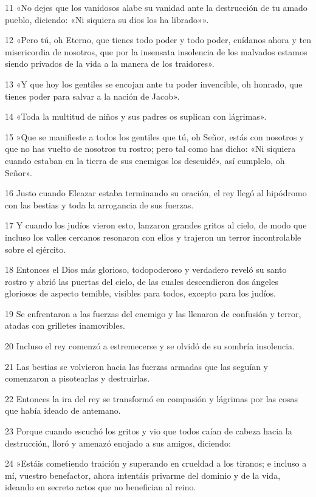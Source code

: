 \par 11 «No dejes que los vanidosos alabe su vanidad ante la destrucción de tu amado pueblo, diciendo: «Ni siquiera su dios los ha librado»».
\par 12 «Pero tú, oh Eterno, que tienes todo poder y todo poder, cuídanos ahora y ten misericordia de nosotros, que por la insensata insolencia de los malvados estamos siendo privados de la vida a la manera de los traidores».
\par 13 «Y que hoy los gentiles se encojan ante tu poder invencible, oh honrado, que tienes poder para salvar a la nación de Jacob».
\par 14 «Toda la multitud de niños y sus padres os suplican con lágrimas».
\par 15 »Que se manifieste a todos los gentiles que tú, oh Señor, estás con nosotros y que no has vuelto de nosotros tu rostro; pero tal como has dicho: «Ni siquiera cuando estaban en la tierra de sus enemigos los descuidé», así cumplelo, oh Señor».
\par 16 Justo cuando Eleazar estaba terminando su oración, el rey llegó al hipódromo con las bestias y toda la arrogancia de sus fuerzas.
\par 17 Y cuando los judíos vieron esto, lanzaron grandes gritos al cielo, de modo que incluso los valles cercanos resonaron con ellos y trajeron un terror incontrolable sobre el ejército.
\par 18 Entonces el Dios más glorioso, todopoderoso y verdadero reveló su santo rostro y abrió las puertas del cielo, de las cuales descendieron dos ángeles gloriosos de aspecto temible, visibles para todos, excepto para los judíos.
\par 19 Se enfrentaron a las fuerzas del enemigo y las llenaron de confusión y terror, atadas con grilletes inamovibles.
\par 20 Incluso el rey comenzó a estremecerse y se olvidó de su sombría insolencia.
\par 21 Las bestias se volvieron hacia las fuerzas armadas que las seguían y comenzaron a pisotearlas y destruirlas.
\par 22 Entonces la ira del rey se transformó en compasión y lágrimas por las cosas que había ideado de antemano.
\par 23 Porque cuando escuchó los gritos y vio que todos caían de cabeza hacia la destrucción, lloró y amenazó enojado a sus amigos, diciendo:
\par 24 »Estáis cometiendo traición y superando en crueldad a los tiranos; e incluso a mí, vuestro benefactor, ahora intentáis privarme del dominio y de la vida, ideando en secreto actos que no benefician al reino.

